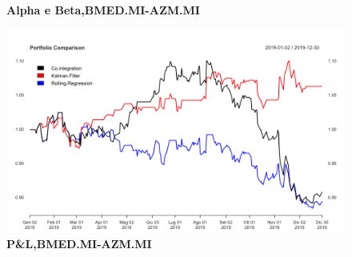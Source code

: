 \documentclass[]{article}
\begin{document}
\
\\
\begin{figure}[htp]
	\begin{center}
		
		
		
		\caption{\textbf{Alpha e Beta,BMED.MI-AZM.MI}}
		
	\end{center}
\end{figure}


\begin{figure}
	\centering
	\includegraphics[scale=0.3]{bmed_azm_portfolio.png}
	\caption{\textbf{P\&L,BMED.MI-AZM.MI}}
\end{figure}
\end{document}
